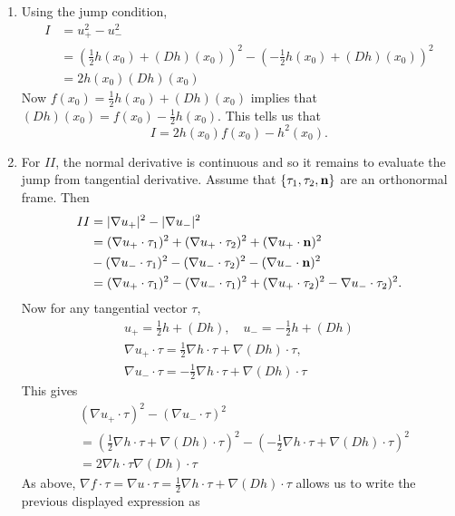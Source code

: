 \documentclass[preprint,11pt]{article}
\begin{document}
\begin{enumerate}
\item Using the jump condition, 
\begin{align*}
I 
&= u_+^2 - u_-^2 \\
&= (\tfrac{1}{2}h(x_0) + (Dh)(x_0))^2 - (-\tfrac{1}{2}h(x_0) + (Dh)(x_0))^2 \\
&= 2h(x_0)(Dh)(x_0) 
\end{align*}
Now $f(x_0) = \tfrac{1}{2}h(x_0) + (Dh)(x_0)$ implies that $(Dh)(x_0) = f(x_0) - \tfrac{1}{2}h(x_0).$ 
This tells us that 
\begin{equation}
I = 2h(x_0)f(x_0) - h^2(x_0).
\end{equation}
\item
For $II$, the normal derivative is continuous and so it remains to evaluate the jump from tangential derivative. 
Assume that $\{\tau_1, \tau_2, {\bf n}\}$ are an orthonormal frame.  Then
\begin{align*}
II &=  |\nabla u_+|^2 - |\nabla u_-|^2  \\
&= (\nabla u_+ \cdot \tau_1 )^2 + (\nabla u_+ \cdot \tau_2 )^2 + (\nabla u_+ \cdot {\bf n} )^2\\
& - (\nabla u_- \cdot \tau_1 )^2 - (\nabla u_- \cdot \tau_2 )^2 - (\nabla u_- \cdot {\bf n} )^2\\
&= (\nabla u_+ \cdot \tau_1 )^2 - (\nabla u_- \cdot \tau_1 )^2 + (\nabla u_+ \cdot \tau_2 )^2 - \nabla u_- \cdot \tau_2 )^2.
\end{align*}
Now for any tangential vector $\tau,$ 
\begin{gather*}
u_+ = \tfrac{1}{2}h + (Dh),\quad u_- = -\tfrac{1}{2}h + (Dh)\\
\nabla u_+ \cdot \tau =  \tfrac{1}{2}\nabla h \cdot \tau + \nabla (Dh) \cdot \tau,\\
\nabla u_- \cdot \tau = -\tfrac{1}{2}\nabla h \cdot \tau + \nabla (Dh) \cdot \tau
\end{gather*}
This gives 
\begin{align*}
&(\nabla u_+ \cdot \tau)^2 - (\nabla u_- \cdot \tau)^2\\
&= (\tfrac{1}{2}\nabla h \cdot \tau + \nabla (Dh) \cdot \tau)^2 - (-\tfrac{1}{2}\nabla h \cdot \tau + \nabla (Dh) \cdot \tau)^2\\
&= 2\nabla h \cdot \tau \nabla (Dh) \cdot \tau
\end{align*}
As above, $\nabla f \cdot \tau = \nabla u \cdot \tau = \tfrac{1}{2}\nabla h \cdot \tau + \nabla (Dh) \cdot \tau$ allows us
to write the previous displayed expression as 
\begin{equation}

\end{equation}
\end{enumerate}
\end{document}
